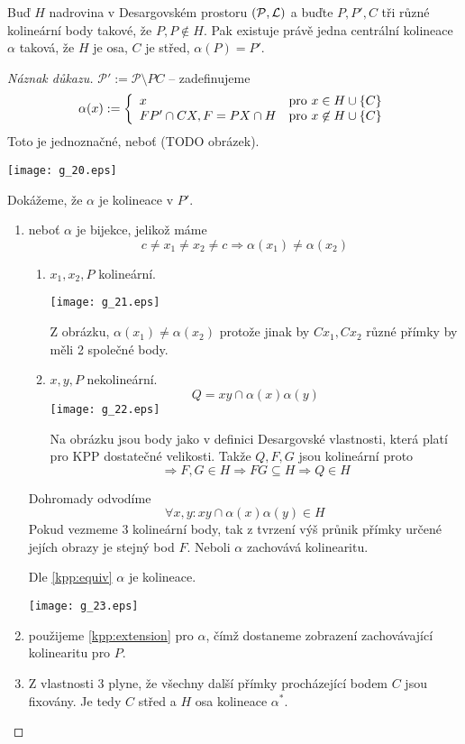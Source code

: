 \begin{theorem}[Baerova]\label{kpp:baer}
    Buď $H$ nadrovina v Desargovském prostoru $(\mathcal{P},\operatorname{\mathcal{L}})$ a buďte $P,P', C$ tři různé kolineární body takové, že $P,P\not\in H$.
    Pak existuje právě jedna centrální kolineace $\alpha$ taková, že $H$ je osa, $C$ je střed, $\alpha(P)=P'$.
\end{theorem}
\begin{proof}[Náznak důkazu]
    $\mathcal{P}':=\mathcal{P}\setminus PC$ -- zadefinujeme
    \[ \alpha(x) := \left\{ \begin{array}{ll} x & \mbox{pro } x\in H\cup \{C\} \\ FP'\cap CX, F=PX\cap H & \mbox{pro } x\not\in H\cup \{C\} \end{array} \right. \]
    Toto je jednoznačné, neboť (TODO obrázek).

    \texttt{[image: g\_20.eps]}

    Dokážeme, že $\alpha$ je kolineace v $P'$.
    \begin{enumerate}
	    \item neboť $\alpha$ je bijekce, jelikož máme
		    \[ c \neq x_1 \neq x_2 \neq c\Rightarrow \alpha(x_1)\neq\alpha(x_2) \]
    		\begin{enumerate}
			\item $x_1, x_2, P$ kolineární.

    \texttt{[image: g\_21.eps]}

    Z obrázku, $\alpha(x_1)\neq\alpha(x_2)$ protože jinak by $Cx_1, Cx_2$ různé přímky by měli 2 společné body.
			\item $x, y, P$ nekolineární.
				\[ Q = xy \cap \alpha(x)\alpha(y) \]
    \texttt{[image: g\_22.eps]}

    			Na obrázku jsou body jako v definici Desargovské vlastnosti, která platí pro KPP dostatečné velikosti.
			Takže $Q, F, G$ jsou kolineární proto
			\[ \Rightarrow F, G \in H \Rightarrow FG \subseteq H \Rightarrow Q \in H\]

    		\end{enumerate}

		Dohromady odvodíme
		\[ \forall x, y: xy \cap \alpha(x)\alpha(y) \in H \]
		Pokud vezmeme 3 kolineární body, tak z tvrzení výš průnik přímky určené jejích obrazy je stejný bod $F$. Neboli $\alpha$ zachovává kolinearitu.

		Dle \cref{kpp:equiv} $\alpha$ je kolineace.

    \texttt{[image: g\_23.eps]}

	\item použijeme \cref{kpp:extension} pro $\alpha$, čímž dostaneme zobrazení zachovávající kolinearitu pro $P$.
	\item Z vlastnosti 3 plyne, že všechny další přímky procházející bodem $C$ jsou fixovány.
		Je tedy $C$ střed a $H$ osa kolineace $\alpha^*$.
    \end{enumerate}
\end{proof}

